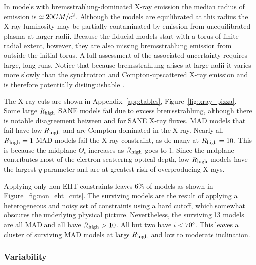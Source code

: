 In models with bremsstrahlung-dominated X-ray emission the median radius of emission is $\simeq 20 GM/c^2$.  Although the models are equilibrated at this radius the X-ray luminosity may be partially contaminated by emission from unequilibrated plasma at larger radii.  Because the fiducial models start with a torus of finite radial extent, however, they are also missing bremsstrahlung emission from outside the initial torus.  A full assessment of the associated uncertainty requires large, long runs.  Notice that because bremsstrahlung arises at large radii it varies more slowly than the synchrotron and Compton-upscattered X-ray emission and is therefore potentially distinguishable \citep{2013ApJ...774...42N}.  

The X-ray cuts are shown in Appendix~\ref{app:tables},  Figure~\ref{fig:xray_pizza}.  Some large $R_\mathrm{high}$ SANE models fail due to excess bremsstrahlung, although there is notable disagreement between \bhac and \kharma for SANE X-ray fluxes.
MAD models that fail have low $R_\mathrm{high}$ and are Compton-dominated in the X-ray.
Nearly all $R_\mathrm{high} = 1$ MAD models fail the X-ray constraint, as do many at $R_\mathrm{high} = 10$.  This is because the midplane $\Theta_e$ increases as $R_\mathrm{high}$ goes to $1$.
Since the midplane contributes most of the electron scattering optical depth, low $R_\mathrm{high}$ models have the largest $y$ parameter and are at greatest risk of overproducing X-rays.


Applying only non-EHT constraints leaves $6\%$ of models as shown in Figure~\ref{fig:non_eht_cuts}.
The surviving models are the result of applying a heterogeneous and noisy set of constraints using a hard cutoff, which somewhat obscures the underlying physical picture.
Nevertheless, the surviving 13 models are all MAD and all have $R_\mathrm{high} > 10$.  All but two have $i < 70\degree$.
This leaves a cluster of surviving MAD models at large $R_\mathrm{high}$ and low to moderate inclination.

\subsubsection{Variability}

